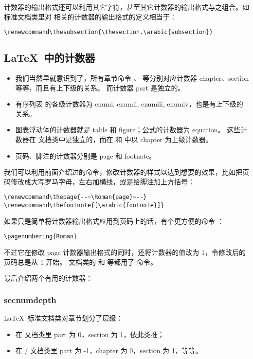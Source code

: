 计数器的输出格式还可以利用其它字符，甚至其它计数器的输出格式与之组合。如标准文档类里对  相关的计数器的输出格式的定义相当于：
\begin{verbatim}
\renewcommand\thesubsection{\thesection.\arabic{subsection}}
\end{verbatim}

\subsection{\LaTeX\ 中的计数器}\label{subsec:latex-counts}

\begin{itemize}
  \item 我们当然早就意识到了，所有章节命令 、 等分别对应计数器 chapter、section 等等，而且有上下级的关系。
        而计数器 part 是独立的。
  \item 有序列表  的各级计数器为 enumi, enumii, enumiii, enumiv，也是有上下级的关系。
  \item 图表浮动体的计数器就是 table 和 figure；公式的计数器为 equation。
        这些计数器在  文档类中是独立的，而在  和  中以 chapter 为上级计数器。
  \item 页码、脚注的计数器分别是 page 和 footnote。
\end{itemize}

我们可以利用前面介绍过的命令，修改计数器的样式以达到想要的效果，比如把页码修改成大写罗马字母，左右加横线，或是给脚注加上方括号：
\begin{verbatim}
\renewcommand\thepage{--~\Roman{page}~--}
\renewcommand\thefootnote{[\arabic{footnote}]}
\end{verbatim}

如果只是简单将计数器输出格式应用到页码上的话，有个更方便的命令 ：
\begin{verbatim}
\pagenumbering{Roman}
\end{verbatim}
不过它在修改 page 计数器输出格式的同时，还将计数器的值改为 1，令修改后的页码总是从 1 开始。 文档类的
 和  等都用了  命令。

最后介绍两个有用的计数器：

\subsubsection{secnumdepth}

\LaTeX\ 标准文档类对章节划分了层级：
\begin{itemize}
  \item 在  文档类里 part 为 0，section 为 1，依此类推；
  \item 在 / 文档类里 part 为 -1，chapter 为 0，section 为 1，等等。
\end{itemize}

